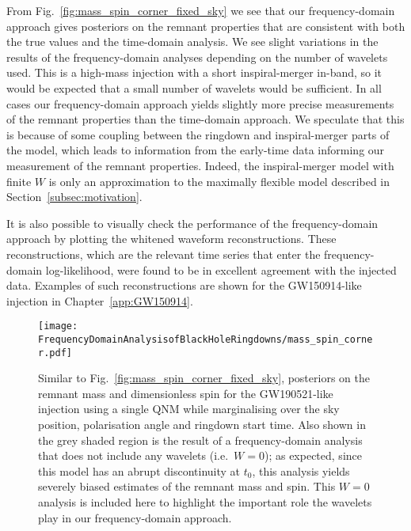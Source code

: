 From Fig.~\ref{fig:mass_spin_corner_fixed_sky} we see that our frequency-domain approach gives posteriors on the remnant properties that are consistent with both the true values and the time-domain analysis.
We see slight variations in the results of the frequency-domain analyses depending on the number of wavelets used.
This is a high-mass injection with a short inspiral-merger in-band, so it would be expected that a small number of wavelets would be sufficient.
In all cases our frequency-domain approach yields slightly more precise measurements of the remnant properties than the time-domain approach.
We speculate that this is because of some coupling between the ringdown and inspiral-merger parts of the model, which leads to information from the early-time data informing our measurement of the remnant properties.
Indeed, the inspiral-merger model with finite $W$ is only an approximation to the maximally flexible model described in Section~\ref{subsec:motivation}.

It is also possible to visually check the performance of the frequency-domain approach by plotting the whitened waveform reconstructions.
These reconstructions, which are the relevant time series that enter the frequency-domain log-likelihood, were found to be in excellent agreement with the injected data. 
Examples of such reconstructions are shown for the GW150914-like injection in Chapter~\ref{app:GW150914}.

\begin{figure}[t!]
    \centering
    \texttt{[image: FrequencyDomainAnalysisofBlackHoleRingdowns/mass\_spin\_corner.pdf]}
    \caption[Posteriors on the remnant mass and spin for a GW190521-like injection analysed while marginalising over the sky position, polarisation angle and ringdown start time]{ 
    Similar to Fig.~\ref{fig:mass_spin_corner_fixed_sky}, posteriors on the remnant mass and dimensionless spin for the GW190521-like injection using a single QNM while marginalising over the sky position, polarisation angle and ringdown start time.
    Also shown in the grey shaded region is the result of a frequency-domain analysis that does not include any wavelets (i.e.\ $W=0$); as expected, since this model has an abrupt discontinuity at $t_0$, this analysis yields severely biased estimates of the remnant mass and spin. 
    This $W=0$ analysis is included here to highlight the important role the wavelets play in our frequency-domain approach.
    }
    \label{fig:mass_spin_corner_zero_spin}
\end{figure}

